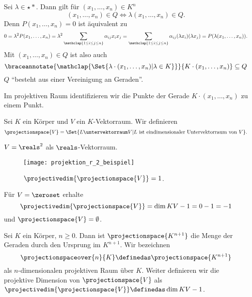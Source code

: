 Sei \( \lambda\in \star{*} \). Dann gilt für \( (x_1,\dotsc,x_n)\in K^n \)
\begin{equation*}
  (x_1,\dotsc,x_n)\in Q\iff \lambda(x_1,\dotsc,x_n)\in Q.
\end{equation*}
Denn \( P(x_1,\dotsc,x_n)=0 \) ist äquivalent zu 
\begin{equation*}
  0=\lambda^2 P(x_1,\dotsc,x_n)=\lambda^2 \sum_{\mathclap{1\leq i\leq j\leq n}} \alpha_{ij}x_i x_j=\sum_{\mathclap{1\leq i\leq j\leq n}} \alpha_{ij}(\lambda x_i)(\lambda x_j)=P(\lambda(x_1,\dotsc,x_n)).
\end{equation*}
Mit \( (x_1,\dotsc,x_n)\in Q \) ist also auch
\begin{equation*}
  \braceannotate{\mathclap{\Set{\lambda\cdot (x_1,\dotsc,x_n)|\lambda\in K}}}{K\cdot (x_1,\dotsc, x_n)}\subseteq Q
\end{equation*}
\dh \( Q \) \enquote{besteht aus einer Vereinigung an Geraden}.
\begin{idee*}
  Im projektiven Raum identifizieren wir die Punkte der Gerade \( K\cdot(x_1,\dotsc,x_n) \) zu einem Punkt.
\end{idee*}  
\begin{definition*}
  Sei \( K \) ein Körper und \( V \) ein \( K \)-Vektorraum. Wir definieren
  \begin{equation*}
    \projectionspace{V}=\Set{L\untervektorraum V| L\ \text{ist eindimensionaler Untervektorraum von \( V \)}}.
  \end{equation*}
\end{definition*}
\begin{beispiel*}
  \( V=\reals^2 \) als \( \reals \)-Vektorraum.
  \begin{figure}[H]
    \centering
    \texttt{[image: projektion\_r\_2\_beispiel]}
    \caption*{\( \projectivedim{\projectionspace{V}}=1 \).}
    \label{fig:projektion_r_2_beispiel}
  \end{figure}
\end{beispiel*}
\begin{bemerkung*}
  Für \( V=\zeroset \) erhalte
  \begin{equation*}
    \projectivedim{\projectionspace{V}}=\dim{K}{V}-1=0-1=-1
  \end{equation*}
  und \( \projectionspace{V}=\emptyset \).
\end{bemerkung*}
\begin{bspdef}
  Sei \( K \) ein Körper, \( n\geq 0 \). Dann ist \( \projectionspace{K^{n+1}} \) die Menge der Geraden durch den Ursprung im \( K^{n+1} \). Wir bezeichnen
  \begin{equation*}
    \projectionspaceover{n}{K}\definedas \projectionspace{K^{n+1}}
  \end{equation*}
  als \( n \)-dimensionalen projektiven Raum über \( K \). Weiter definieren wir die projektive Dimension von \( \projectionspace{V} \) als \( \projectivedim{\projectionspace{V}}\definedas \dim{K}{V}-1 \).
\end{bspdef}
